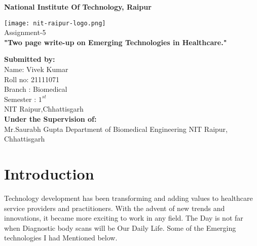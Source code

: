 \documentclass[12pt]{article}
\begin{document}
\pagestyle{empty}



   \begin{center}
       \vspace{1cm}
	   \Large
       \textbf{National Institute Of Technology, Raipur } 
       \vspace{1.5cm}
     
       \texttt{[image: nit-raipur-logo.png]}\\
       \vspace{0.8cm}
       \Huge
       Assignment-5\\
       \vspace{0.8cm}
      \textbf{ "Two page write-up on Emerging Technologies in Healthcare."}
      
	\vfill      
      
   \begin{multicols}{2} 
   \begin{flushleft}
       \large
       \textbf{Submitted by:}\\
       Name: Vivek Kumar\\
       Roll no: 21111071\\
       Branch : Biomedical\\
       Semester : $1^{st}$ \\
       NIT Raipur,Chhattisgarh\\
       \columnbreak
       \textbf{Under the Supervision of:}\\
       Mr.Saurabh Gupta
       Department of Biomedical Engineering
       NIT Raipur, Chhattisgarh
    \end{flushleft}
    \end{multicols}    
            
   \end{center}

\clearpage
\pagestyle{fancy}
\tableofcontents
\clearpage
\section{Introduction}
Technology development has been transforming and adding values to healthcare service providers and practitioners. With the advent of new trends and innovations, it became more exciting to work in any field. The Day is not far when Diagnostic body scans will be Our Daily Life. Some of the Emerging technologies I had Mentioned below.
\end{document}
